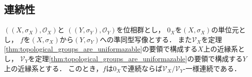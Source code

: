 \subsection{連続性}
	\begin{screen}
		\begin{thm}[単位元で連続な準同型は一様連続である]
			$\left(\left(X,\sigma_X\right),\mathscr{O}_X\right)$と
			$\left(\left(Y,\sigma_Y\right),\mathscr{O}_Y\right)$を位相群とし，
			$0_X$を$\left(X,\sigma_X\right)$の単位元とし，
			$f$を$\left(X,\sigma_X\right)$から$\left(Y,\sigma_Y\right)$への準同型写像とする．
			また$\mathscr{V}_X$を定理\ref{thm:topological_groups_are_uniformazable}の要領で構成する$X$上の近縁系とし，
			$\mathscr{V}_Y$を定理\ref{thm:topological_groups_are_uniformazable}の要領で構成する$Y$上の近縁系とする．
			このとき，$f$は$0_X$で連続ならば$\mathscr{V}_X/\mathscr{V}_Y$-一様連続である．
		\end{thm}
	\end{screen}